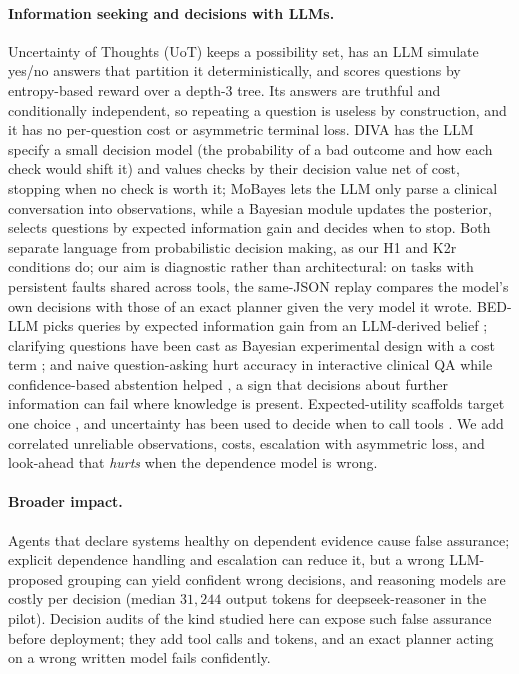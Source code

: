 \paragraph{Information seeking and decisions with LLMs.}
Uncertainty of Thoughts (UoT) \citep{hu2024uncertainty} keeps a possibility set, has an LLM simulate yes/no answers that partition it deterministically, and scores questions by entropy-based reward over a depth-3 tree.
Its answers are truthful and conditionally independent, so repeating a question is useless by construction, and it has no per-question cost or asymmetric terminal loss.
DIVA \citep{lee2026diva} has the LLM specify a small decision model (the probability of a bad outcome and how each check would shift it) and values checks by their decision value net of cost, stopping when no check is worth it; MoBayes \citep{kesmen2026mobayes} lets the LLM only parse a clinical conversation into observations, while a Bayesian module updates the posterior, selects questions by expected information gain and decides when to stop. Both separate language from probabilistic decision making, as our H1 and K2r conditions do; our aim is diagnostic rather than architectural: on tasks with persistent faults shared across tools, the same-JSON replay compares the model's own decisions with those of an exact planner given the very model it wrote.
BED-LLM picks queries by expected information gain from an LLM-derived belief \citep{choudhury2026bedllm}; clarifying questions have been cast as Bayesian experimental design with a cost term \citep{kobalczyk2025active}; and naive question-asking hurt accuracy in interactive clinical QA while confidence-based abstention helped \citep{li2024mediq}, a sign that decisions about further information can fail where knowledge is present.
Expected-utility scaffolds target one choice \citep{liu2025dellma}, and uncertainty has been used to decide when to call tools \citep{han2024towards}.
We add correlated unreliable observations, costs, escalation with asymmetric loss, and look-ahead that \emph{hurts} when the dependence model is wrong.

\paragraph{Broader impact.}\label{app:impact-archived}
Agents that declare systems healthy on dependent evidence cause false assurance; explicit dependence handling and escalation can reduce it, but a wrong LLM-proposed grouping can yield confident wrong decisions, and reasoning models are costly per decision (median $31{,}244$ output tokens for deepseek-reasoner in the pilot). Decision audits of the kind studied here can expose such false assurance before deployment; they add tool calls and tokens, and an exact planner acting on a wrong written model fails confidently.

